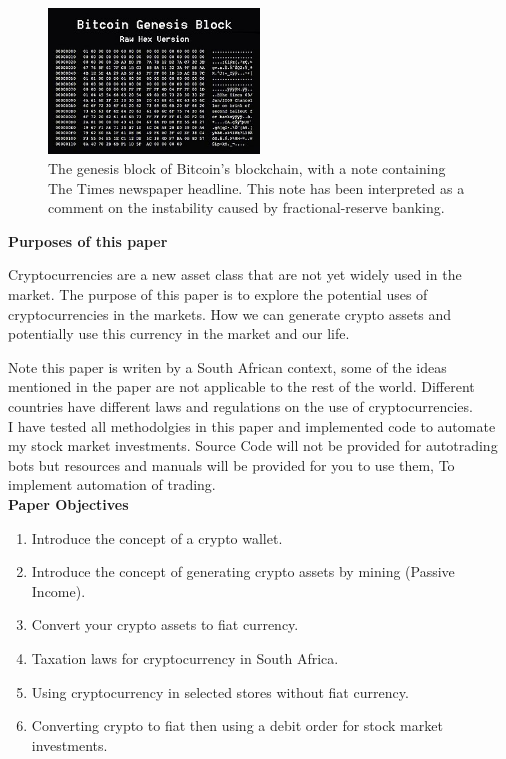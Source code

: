 \begin{figure}[H]
\centering
\includegraphics[width=0.5\textwidth]{images/Bitcoin-Genesis-block.jpg}
\caption{The genesis block of Bitcoin's blockchain, with a note containing The Times newspaper headline. This note has been interpreted as a comment on the instability caused by fractional-reserve banking.}
\label{fig:bitcoin-genesis-block}
\end{figure}

\textbf{Purposes of this paper}

Cryptocurrencies are a new asset class that are not yet widely used in the market. The purpose of this paper is to explore the potential uses of cryptocurrencies in the markets. How we can generate crypto assets and potentially use this currency in the market and our life.

Note this paper is writen by a South African context, some of the ideas mentioned in the paper are not applicable to the rest of the world. Different countries have different laws and regulations on the use of cryptocurrencies. \\

I have tested all methodolgies in this paper and implemented code to automate my stock market investments. Source Code will not be provided for autotrading bots but resources and manuals will be provided for you to use them, To implement automation of trading. \\

\textbf{Paper Objectives}

\begin{enumerate}
\item Introduce the concept of a crypto wallet.
\item Introduce the concept of generating crypto assets by mining (Passive Income).
\item Convert your crypto assets to fiat currency.
\item Taxation laws for cryptocurrency in South Africa.
\item Using cryptocurrency in selected stores without fiat currency.
\item Converting crypto to fiat then using a debit order for stock market investments.
\end{enumerate}

